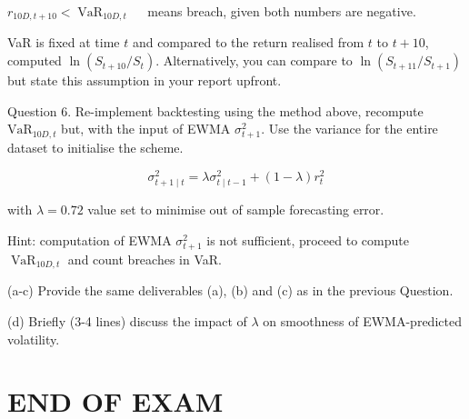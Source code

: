 \documentclass[10pt]{article}
\begin{document}
$r_{10 D, t+10}<\operatorname{VaR}_{10 D, t} \quad$ means breach, given both numbers are negative.

VaR is fixed at time $t$ and compared to the return realised from $t$ to $t+10$, computed $\ln \left(S_{t+10} / S_{t}\right)$. Alternatively, you can compare to $\ln \left(S_{t+11} / S_{t+1}\right)$ but state this assumption in your report upfront.

Question 6. Re-implement backtesting using the method above, recompute $\mathrm{VaR}_{10 D, t}$ but, with the input of EWMA $\sigma_{t+1}^{2}$. Use the variance for the entire dataset to initialise the scheme.

$$
\sigma_{t+1 \mid t}^{2}=\lambda \sigma_{t \mid t-1}^{2}+(1-\lambda) r_{t}^{2}
$$

with $\lambda=0.72$ value set to minimise out of sample forecasting error.

Hint: computation of EWMA $\sigma_{t+1}^{2}$ is not sufficient, proceed to compute $\operatorname{VaR}_{10 D, t}$ and count breaches in VaR.

(a-c) Provide the same deliverables (a), (b) and (c) as in the previous Question.

(d) Briefly (3-4 lines) discuss the impact of $\lambda$ on smoothness of EWMA-predicted volatility.

\section*{END OF EXAM}
\end{document}
